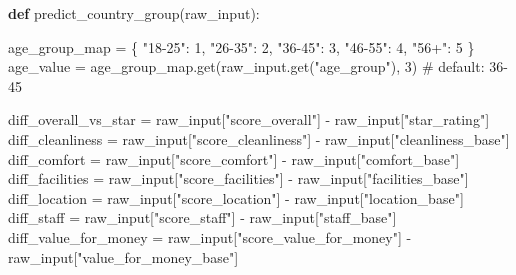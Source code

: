 \documentclass[
  letterpaper,
  DIV=11,
  numbers=noendperiod]{scrartcl}
\newenvironment{Shaded}{\begin{snugshade}}{\end{snugshade}}
\newcommand{\BuiltInTok}[1]{\textcolor[rgb]{0.00,0.23,0.31}{#1}}
\newcommand{\CommentTok}[1]{\textcolor[rgb]{0.37,0.37,0.37}{#1}}
\newcommand{\DecValTok}[1]{\textcolor[rgb]{0.68,0.00,0.00}{#1}}
\newcommand{\KeywordTok}[1]{\textcolor[rgb]{0.00,0.23,0.31}{\textbf{#1}}}
\newcommand{\NormalTok}[1]{\textcolor[rgb]{0.00,0.23,0.31}{#1}}
\newcommand{\OperatorTok}[1]{\textcolor[rgb]{0.37,0.37,0.37}{#1}}
\newcommand{\StringTok}[1]{\textcolor[rgb]{0.13,0.47,0.30}{#1}}
\begin{document}
\begin{Shaded}
\begin{Highlighting}[]
\KeywordTok{def}\NormalTok{ predict\_country\_group(}\BuiltInTok{raw\_input}\NormalTok{):}

\NormalTok{    age\_group\_map }\OperatorTok{=}\NormalTok{ \{}
        \StringTok{"18{-}25"}\NormalTok{: }\DecValTok{1}\NormalTok{,}
        \StringTok{"26{-}35"}\NormalTok{: }\DecValTok{2}\NormalTok{,}
        \StringTok{"36{-}45"}\NormalTok{: }\DecValTok{3}\NormalTok{,}
        \StringTok{"46{-}55"}\NormalTok{: }\DecValTok{4}\NormalTok{,}
        \StringTok{"56+"}\NormalTok{: }\DecValTok{5}
\NormalTok{    \}}
\NormalTok{    age\_value }\OperatorTok{=}\NormalTok{ age\_group\_map.get(}\BuiltInTok{raw\_input}\NormalTok{.get(}\StringTok{"age\_group"}\NormalTok{), }\DecValTok{3}\NormalTok{)  }\CommentTok{\# default: 36{-}45}

\NormalTok{    diff\_overall\_vs\_star }\OperatorTok{=} \BuiltInTok{raw\_input}\NormalTok{[}\StringTok{"score\_overall"}\NormalTok{] }\OperatorTok{{-}} \BuiltInTok{raw\_input}\NormalTok{[}\StringTok{"star\_rating"}\NormalTok{]}
\NormalTok{    diff\_cleanliness }\OperatorTok{=} \BuiltInTok{raw\_input}\NormalTok{[}\StringTok{"score\_cleanliness"}\NormalTok{] }\OperatorTok{{-}} \BuiltInTok{raw\_input}\NormalTok{[}\StringTok{"cleanliness\_base"}\NormalTok{]}
\NormalTok{    diff\_comfort }\OperatorTok{=} \BuiltInTok{raw\_input}\NormalTok{[}\StringTok{"score\_comfort"}\NormalTok{] }\OperatorTok{{-}} \BuiltInTok{raw\_input}\NormalTok{[}\StringTok{"comfort\_base"}\NormalTok{]}
\NormalTok{    diff\_facilities }\OperatorTok{=} \BuiltInTok{raw\_input}\NormalTok{[}\StringTok{"score\_facilities"}\NormalTok{] }\OperatorTok{{-}} \BuiltInTok{raw\_input}\NormalTok{[}\StringTok{"facilities\_base"}\NormalTok{]}
\NormalTok{    diff\_location }\OperatorTok{=} \BuiltInTok{raw\_input}\NormalTok{[}\StringTok{"score\_location"}\NormalTok{] }\OperatorTok{{-}} \BuiltInTok{raw\_input}\NormalTok{[}\StringTok{"location\_base"}\NormalTok{]}
\NormalTok{    diff\_staff }\OperatorTok{=} \BuiltInTok{raw\_input}\NormalTok{[}\StringTok{"score\_staff"}\NormalTok{] }\OperatorTok{{-}} \BuiltInTok{raw\_input}\NormalTok{[}\StringTok{"staff\_base"}\NormalTok{]}
\NormalTok{    diff\_value\_for\_money }\OperatorTok{=} \BuiltInTok{raw\_input}\NormalTok{[}\StringTok{"score\_value\_for\_money"}\NormalTok{] }\OperatorTok{{-}} \BuiltInTok{raw\_input}\NormalTok{[}\StringTok{"value\_for\_money\_base"}\NormalTok{]}


\end{Highlighting}
\end{Shaded}
\end{document}
